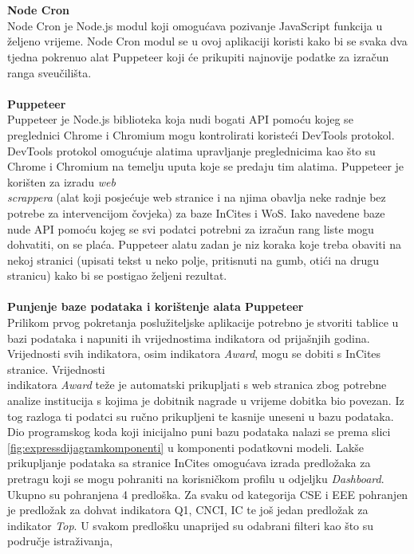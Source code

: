 \documentclass[times, utf8, zavrsni]{fer}
\begin{document}
\\\\\textbf{Node Cron}
\\ Node Cron je Node.js modul koji omogućava pozivanje JavaScript funkcija u željeno vrijeme. Node Cron modul se u ovoj 
aplikaciji koristi kako bi se svaka dva tjedna pokrenuo alat Puppeteer koji će prikupiti najnovije podatke za izračun ranga sveučilišta.
\\ \\ \textbf{Puppeteer}
\\ Puppeteer je Node.js biblioteka koja nudi bogati API pomoću kojeg se preglednici Chrome i Chromium mogu kontrolirati koristeći DevTools protokol.
DevTools protokol omogućuje alatima upravljanje preglednicima kao što su Chrome i Chromium na temelju uputa koje se predaju tim alatima.
Puppeteer je korišten za izradu \emph{web \\scrappera} (alat koji posjećuje web stranice i 
na njima obavlja neke radnje bez potrebe za intervencijom čovjeka) za baze InCites i WoS. Iako navedene baze nude API pomoću kojeg se svi
podatci potrebni za izračun rang liste mogu dohvatiti, on se plaća. Puppeteer alatu zadan je niz koraka koje treba obaviti na nekoj stranici (upisati tekst u neko polje, pritisnuti na gumb, otići na drugu stranicu)
kako bi se postigao željeni rezultat.
\\\\\textbf{Punjenje baze podataka i korištenje alata Puppeteer}
\\Prilikom prvog pokretanja poslužiteljske aplikacije potrebno je stvoriti tablice u bazi podataka i napuniti ih vrijednostima indikatora od prijašnjih godina.
Vrijednosti svih indikatora, osim indikatora \emph{Award}, mogu se dobiti s InCites stranice. Vrijednosti \\indikatora \emph{Award} teže je automatski prikupljati 
s web stranica zbog potrebne analize institucija s kojima je dobitnik nagrade u vrijeme dobitka bio povezan. Iz tog razloga ti podatci 
su ručno prikupljeni te kasnije uneseni u bazu podataka. 
\\Dio programskog koda koji inicijalno puni bazu podataka nalazi se prema slici \ref{fig:expressdijagramkomponenti} u komponenti podatkovni modeli. Lakše prikupljanje podataka sa stranice InCites omogućava izrada predložaka za pretragu koji se mogu pohraniti 
na korisničkom profilu u odjeljku \emph{Dashboard}. Ukupno su pohranjena 4 predloška. Za svaku od kategorija CSE i EEE pohranjen je predložak 
za dohvat indikatora Q1, CNCI, IC te još jedan predložak za indikator \emph{Top}. U svakom predlošku unaprijed su odabrani filteri kao što su područje istraživanja,
\end{document}
